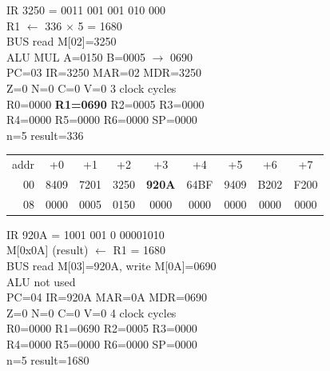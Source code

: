 \noindent\begin{tcolorbox}[stepbox, title={Step 18 \hfill PC 02 \quad MUL R1, R1, R2}]
\textcolor{dim}{IR} 3250 = 0011 001 001 010 000\\
R1 $\leftarrow$ 336 $\times$ 5 = 1680\\
\textcolor{dim}{BUS} read M[02]=3250\\
\textcolor{dim}{ALU} MUL A=0150 B=0005 $\rightarrow$ 0690\\
PC=03 IR=3250 MAR=02 MDR=3250\\
Z=0 N=0 C=0 V=0 \hfill \textcolor{dim}{3 clock cycles}\\
R0=0000 \textcolor{wrt}{\textbf{R1=0690}} R2=0005 R3=0000\\
R4=0000 R5=0000 R6=0000 SP=0000\\
\textcolor{dim}{n=5  result=336}\\[1pt]
{\setlength{\tabcolsep}{1.6pt}\begin{tabular}{@{}r*{8}{c}@{}}
\textcolor{dim}{addr} & \textcolor{dim}{+0} & \textcolor{dim}{+1} & \textcolor{dim}{+2} & \textcolor{dim}{+3} & \textcolor{dim}{+4} & \textcolor{dim}{+5} & \textcolor{dim}{+6} & \textcolor{dim}{+7}\\
\textcolor{dim}{00} & 8409 & 7201 & 3250 & \cellcolor{pcc}\textbf{920A} & 64BF & 9409 & B202 & F200\\
\textcolor{dim}{08} & 0000 & \cellcolor{datac}0005 & \cellcolor{datac}0150 & 0000 & 0000 & 0000 & 0000 & 0000\\
\end{tabular}}
\end{tcolorbox}\hfill\begin{tcolorbox}[stepbox, title={Step 19 \hfill PC 03 \quad ST R1, result}]
\textcolor{dim}{IR} 920A = 1001 001 0 00001010\\
M[0x0A] (result) $\leftarrow$ R1 = 1680\\
\textcolor{dim}{BUS} read M[03]=920A, \textcolor{wrt}{write M[0A]=0690}\\
\textcolor{dim}{ALU} \textcolor{dim}{not used}\\
PC=04 IR=920A MAR=0A MDR=0690\\
Z=0 N=0 C=0 V=0 \hfill \textcolor{dim}{4 clock cycles}\\
R0=0000 R1=0690 R2=0005 R3=0000\\
R4=0000 R5=0000 R6=0000 SP=0000\\
\textcolor{dim}{n=5  result=1680}\\[1pt]
{\setlength{\tabcolsep}{1.6pt}\begin{tabular}{@{}r*{8}{c}@{}}

\end{tabular}}
\end{tcolorbox}
